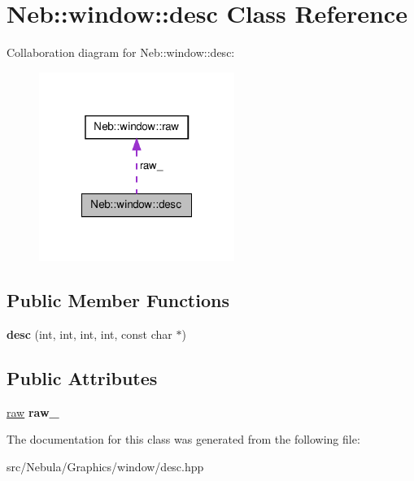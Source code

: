 \hypertarget{classNeb_1_1window_1_1desc}{\section{\-Neb\-:\-:window\-:\-:desc \-Class \-Reference}
\label{classNeb_1_1window_1_1desc}
}


\-Collaboration diagram for \-Neb\-:\-:window\-:\-:desc\-:\nopagebreak
\begin{figure}[H]
\begin{center}
\leavevmode
\includegraphics[width=180pt]{classNeb_1_1window_1_1desc__coll__graph}
\end{center}
\end{figure}
\subsection*{\-Public \-Member \-Functions}
\begin{DoxyCompactItemize}
\item 
\hypertarget{classNeb_1_1window_1_1desc_af2517ebee977a7d5c2878cb4d8c35911}{{\bfseries desc} (int, int, int, int, const char $\ast$)}\label{classNeb_1_1window_1_1desc_af2517ebee977a7d5c2878cb4d8c35911}

\end{DoxyCompactItemize}
\subsection*{\-Public \-Attributes}
\begin{DoxyCompactItemize}
\item 
\hypertarget{classNeb_1_1window_1_1desc_a5261a160f4d84f35241fcd6b5d1540e7}{\hyperlink{structNeb_1_1window_1_1raw}{raw} {\bfseries raw\-\_\-}}\label{classNeb_1_1window_1_1desc_a5261a160f4d84f35241fcd6b5d1540e7}

\end{DoxyCompactItemize}


\-The documentation for this class was generated from the following file\-:\begin{DoxyCompactItemize}
\item 
src/\-Nebula/\-Graphics/window/desc.\-hpp\end{DoxyCompactItemize}
